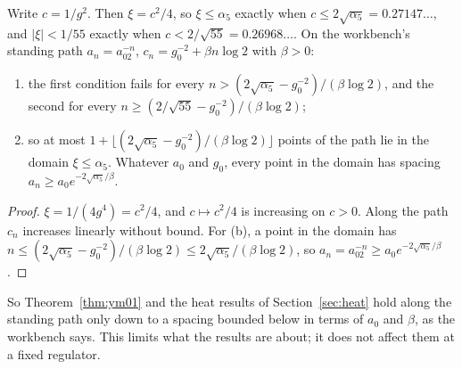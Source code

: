 \begin{proposition}\label{prop:path}
Write $c=1/g^2$. Then $\xi=c^2/4$, so $\xi\le\alpha_5$ exactly when $c\le2\sqrt{\alpha_5}=0.27147\ldots$, and $|\xi|<1/55$ exactly when $c<2/\sqrt{55}=0.26968\ldots$. On the workbench's standing path $a_n=a_02^{-n}$, $c_n=g_0^{-2}+\beta n\log2$ with $\beta>0$:
\begin{enumerate}[label=(\alph*)]
\item the first condition fails for every $n>(2\sqrt{\alpha_5}-g_0^{-2})/(\beta\log2)$, and the second for every $n\ge(2/\sqrt{55}-g_0^{-2})/(\beta\log2)$;
\item so at most $1+\lfloor(2\sqrt{\alpha_5}-g_0^{-2})/(\beta\log2)\rfloor$ points of the path lie in the domain $\xi\le\alpha_5$. Whatever $a_0$ and $g_0$, every point in the domain has spacing $a_n\ge a_0e^{-2\sqrt{\alpha_5}/\beta}$.
\end{enumerate}
\end{proposition}
\begin{proof}
$\xi=1/(4g^4)=c^2/4$, and $c\mapsto c^2/4$ is increasing on $c>0$. Along the path $c_n$ increases linearly without bound. For (b), a point in the domain has $n\le(2\sqrt{\alpha_5}-g_0^{-2})/(\beta\log2)\le2\sqrt{\alpha_5}/(\beta\log2)$, so $a_n=a_02^{-n}\ge a_0e^{-2\sqrt{\alpha_5}/\beta}$.
\end{proof}
So Theorem~\ref{thm:ym01} and the heat results of Section~\ref{sec:heat} hold along the standing path only down to a spacing bounded below in terms of $a_0$ and $\beta$, as the workbench says. This limits what the results are about; it does not affect them at a fixed regulator.
